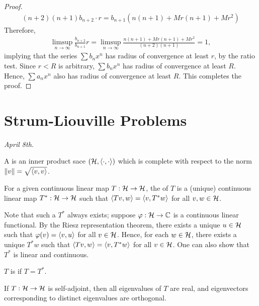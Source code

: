 \begin{proof}
    \begin{align}
        (n+2)(n+1) b_{n+2} \cdot r = b_{n+1} \left( n(n+1) + Mr(n+1) + Mr^{2} \right)
    \end{align}
    Therefore,
    \begin{align}
        \limsup_{n \to \infty} \frac{b_{n+2}}{b_{n+1}}r = \limsup_{n \to \infty} \frac{n(n+1) + Mr(n+1) + Mr^{2}}{(n+2)(n+1)} = 1,
    \end{align}
    implying that the series $\sum b_{n} x^{n}$ has radius of convergence at least $r$, by the ratio test. Since $r < R$ is arbitrary, $\sum b_{n} x^{n}$ has radius of convergence at least $R$. Hence, $\sum a_{n} x^{n}$ also has radius of convergence at least $R$. This completes the proof.
\end{proof}

\section{Strum-Liouville Problems}
\textit{April 8th.}

A  is an inner product sace $(\mathcal{H},\langle\cdot,\cdot\rangle)$ which is complete with respect to the norm $\left\lVert v\right\rVert = \sqrt{\langle v,v\rangle}$.

\begin{definition}
    For a given continuous linear map $T:\mathcal{H} \to \mathcal{H}$, the  of $T$ is a (unique) continuous linear map $T^{\ast}:\mathcal{H} \to \mathcal{H}$ such that $\langle Tv,w\rangle = \langle v,T^{\ast}w\rangle$ for all $v,w \in \mathcal{H}$.
\end{definition}

Note that such a $T^{\ast}$ always exists; suppose $\varphi : \mathcal{H} \to \mathbb{C}$ is a continuous linear functional. By the Riesz representation theorem, there exists a unique $u \in \mathcal{H}$ such that $\varphi(v) = \langle v,u\rangle$ for all $v \in \mathcal{H}$. Hence, for each $w \in \mathcal{H}$, there exists a unique $T^{\ast} w$ such that $\langle Tv,w\rangle = \langle v,T^{\ast} w\rangle$ for all $v \in \mathcal{H}$. One can also show that $T^{\ast}$ is linear and continuous.

\begin{definition}
    $T$ is  if $T = T^{\ast}$.
\end{definition}

\begin{proposition}
    If $T:\mathcal{H} \to \mathcal{H}$ is self-adjoint, then all eigenvalues of $T$ are real, and eigenvectors corresponding to distinct eigenvalues are orthogonal.
\end{proposition}

